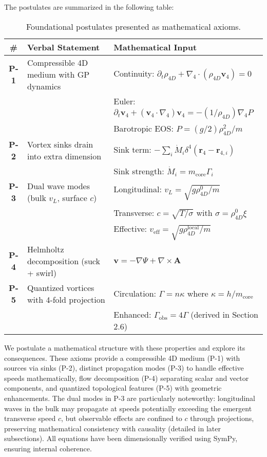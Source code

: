 The postulates are summarized in the following table:

\begin{table}[H]
\centering
\begin{tabularx}{\textwidth}{|c|Y|Y|}
\hline
\# & Verbal Statement & Mathematical Input \\
\hline
\textbf{P-1} & Compressible 4D medium with GP dynamics & Continuity: $\partial_t \rho_{4D} + \nabla_4 \cdot (\rho_{4D} \mathbf{v}_4) = 0$ \\
& & Euler: $\partial_t \mathbf{v}_4 + (\mathbf{v}_4 \cdot \nabla_4) \mathbf{v}_4 = -(1/\rho_{4D}) \nabla_4 P$ \\
& & Barotropic EOS: $P = (g/2) \rho_{4D}^2 / m$ \\
\hline
\textbf{P-2} & Vortex sinks drain into extra dimension & Sink term: $-\sum_i \dot{M}_i \delta^4(\mathbf{r}_4 - \mathbf{r}_{4,i})$ \\
& & Sink strength: $\dot{M}_i = m_{\text{core}} \Gamma_i$ \\
\hline
\textbf{P-3} & Dual wave modes (bulk $v_L$, surface $c$) & Longitudinal: $v_L = \sqrt{g \rho_{4D}^0 / m}$ \\
& & Transverse: $c = \sqrt{T / \sigma}$ with $\sigma = \rho_{4D}^0 \xi$ \\
& & Effective: $v_{\text{eff}} = \sqrt{g \rho_{4D}^{\text{local}} / m}$ \\
\hline
\textbf{P-4} & Helmholtz decomposition (suck + swirl) & $\mathbf{v} = -\nabla \Psi + \nabla \times \mathbf{A}$ \\
\hline
\textbf{P-5} & Quantized vortices with 4-fold projection & Circulation: $\Gamma = n \kappa$ where $\kappa = h / m_{\text{core}}$ \\
& & Enhanced: $\Gamma_{\text{obs}} = 4 \Gamma$ (derived in Section 2.6) \\
\hline
\end{tabularx}
\caption{Foundational postulates presented as mathematical axioms.}
\label{tab:postulates}
\end{table}

We postulate a mathematical structure with these properties and explore its consequences. These axioms provide a compressible 4D medium (P-1) with sources via sinks (P-2), distinct propagation modes (P-3) to handle effective speeds mathematically, flow decomposition (P-4) separating scalar and vector components, and quantized topological features (P-5) with geometric enhancements. The dual modes in P-3 are particularly noteworthy: longitudinal waves in the bulk may propagate at speeds potentially exceeding the emergent transverse speed $c$, but observable effects are confined to $c$ through projections, preserving mathematical consistency with causality (detailed in later subsections). All equations have been dimensionally verified using SymPy, ensuring internal coherence.

